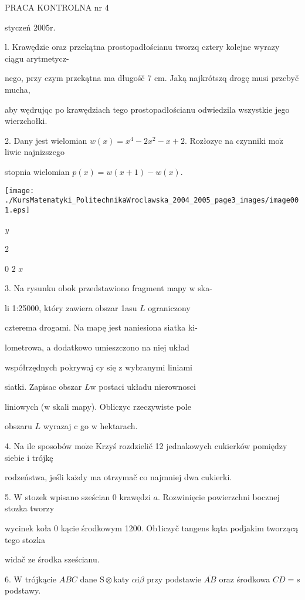\documentclass[a4paper,12pt]{article}
\begin{document}
PRACA KONTROLNA nr 4

styczeń $2005\mathrm{r}.$

l. Krawędzie oraz przekątna prostopadłościanu tworzq cztery kolejne wyrazy ciągu arytmetycz-

nego, przy czym przekątna ma długośč 7 cm. Jaką najkrótszq drogę musi przebyč mucha,

aby wędrujqc po krawędziach tego prostopadłościanu odwiedzila wszystkie jego wierzchołki.

2. Dany jest wielomian $w(x)=x^{4}-2x^{2}-x+2$. Rozłozyc na czynniki $\mathrm{m}\mathrm{o}\dot{\mathrm{z}}$ liwie najnizszego

stopnia wielomian $p(x)=w(x+1)-w(x).$
\begin{center}
\texttt{[image: ./KursMatematyki\_PolitechnikaWroclawska\_2004\_2005\_page3\_images/image001.eps]}
\end{center}
{\it y}

2

0 2 $x$

3. Na rysunku obok przedstawiono fragment mapy $\mathrm{w}$ ska-

li 1:25000, który zawiera obszar 1asu $L$ ograniczony

czterema drogami. Na mapę jest naniesiona siatka ki-

lometrowa, a dodatkowo umieszczono na niej układ

współrzędnych pokrywaj cy się $\mathrm{z}$ wybranymi liniami

siatki. Zapisac obszar $L\mathrm{w}$ postaci układu nierownosci

liniowych ($\mathrm{w}$ skali mapy). Obliczyc rzeczywiste pole

obszaru $L$ wyrazaj $\mathrm{c}$ go $\mathrm{w}$ hektarach.

4. Na ile sposobów $\mathrm{m}\mathrm{o}\dot{\mathrm{z}}\mathrm{e}$ Krzyś rozdzielič 12 jednakowych cukierków pomiędzy siebie $\mathrm{i}$ trójkę

rodzeństwa, jeśli $\mathrm{k}\mathrm{a}\dot{\mathrm{z}}\mathrm{d}\mathrm{y}$ ma otrzymač co najmniej dwa cukierki.

5. $\mathrm{W}$ stozek wpisano sześcian $0$ krawędzi $a$. Rozwinięcie powierzchni bocznej stozka tworzy

wycinek koła $0$ kącie środkowym 1200. Ob1iczyč tangens kąta podjakim tworzącą tego stozka

widač ze środka sześcianu.

6. $\mathrm{W}$ trójkącie $ABC$ dane $\mathrm{S}\otimes$katy $\alpha \mathrm{i}\beta$ przy podstawie $\overline{AB}$ oraz środkowa $CD=s$ podstawy.
\end{document}
